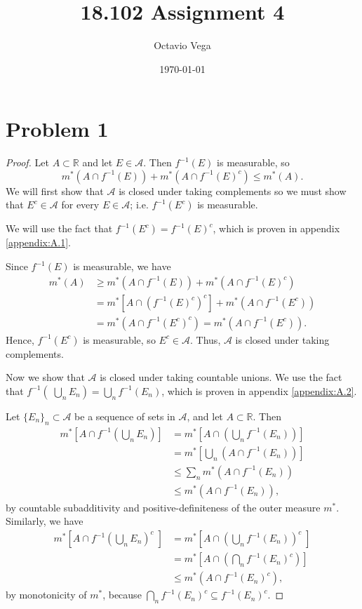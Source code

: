 \documentclass{article}
\title{18.102 Assignment 4}
\author{Octavio Vega}
\date\today
\begin{document}
\maketitle
	
\section*{Problem 1}
\begin{proof}
	Let $A \subset \mathbb{R}$ and let $E \in \mathcal{A}$. Then $f^{-1}(E)$ is measurable, so
	\begin{equation}
		m^*\left(A\cap f^{-1}(E)\right) + m^*\left(A\cap f^{-1}(E)^c\right) \leq m^*(A).
	\end{equation}
	We will first show that $\mathcal{A}$ is closed under taking complements so we must show that $E^c \in \mathcal{A}$ for every $E \in \mathcal{A}$; i.e. $f^{-1}(E^c)$ is measurable. 
	
	We will use the fact that $f^{-1}(E^c) = f^{-1}(E)^c$, which is proven in appendix \ref{appendix:A.1}.
	
	Since $f^{-1}(E)$ is measurable, we have
	\begin{align}
		m^*(A) &\geq m^*\left(A\cap f^{-1}(E)\right) + m^*\left(A\cap f^{-1}(E)^c\right) \\
		&= m^*\left[A\cap\left(f^{-1}(E)^c\right)^c\right] + m^*\left(A\cap f^{-1}(E^c)\right) \\
		&= m^*\left(A\cap f^{-1}(E^c)^c\right) = m^*\left(A\cap f^{-1}(E^c)\right).
	\end{align}
	Hence, $f^{-1}(E^c)$ is measurable, so $E^c \in \mathcal{A}$. Thus, $\mathcal{A}$ is closed under taking complements.
	
	Now we show that $\mathcal{A}$ is closed under taking countable unions. We use the fact that $f^{-1}\left( \; \bigcup_n E_n\right) = \bigcup_n f^{-1}(E_n)$, which is proven in appendix \ref{appendix:A.2}.
	
	Let $\{E_n\}_n \subset \mathcal{A}$ be a sequence of sets in $\mathcal{A}$, and let $A\subset \mathbb{R}$. Then 
	\begin{align}
		m^*\left[A\cap f^{-1}\left(\bigcup_n E_n\right)\right] &= m^*\left[A\cap\left(\bigcup_n f^{-1}(E_n)\right)\right] \\
		&= m^*\left[\bigcup_n\left(A\cap f^{-1}(E_n)\right)\right] \\
		& \leq \sum_n m^*\left(A\cap f^{-1}(E_n)\right) \\
		& \leq m^*\left(A\cap f^{-1}(E_n)\right),
	\end{align}
	by countable subadditivity and positive-definiteness of the outer measure $m^*$. Similarly, we have
	\begin{align}
		m^*\left[A\cap f^{-1}\left(\bigcup_n E_n\right)^c \; \right] &= m^*\left[A\cap \left(\bigcup_n f^{-1}(E_n)\right)^c \; \right] \\
		&= m^*\left[A\cap\left(\bigcap_n f^{-1}(E_n)^c\right)\right] \\
		&\leq m^*\left(A\cap f^{-1}(E_n)^c\right),
	\end{align}
	by monotonicity of $m^*$, because $\bigcap_n f^{-1}(E_n)^c \subseteq f^{-1}(E_n)^c$.
	

\end{proof}
\end{document}
